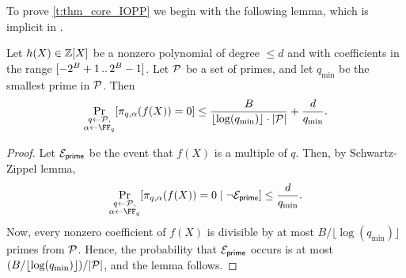 \documentclass[11pt,letterpaper,usenames,dvipsnames]{article}
\begin{document}
To prove \cref{t:thm_core_IOPP} we begin with the following lemma, which is implicit in \cite{zincplus}. 
\begin{lemma}\label{l:reduction_lemma}
Let $h(X)\in \mathbb{Z}[X]$ be a nonzero polynomial of degree $\leq d$ and with coefficients in the range $[-2^{B}+1 \, .. \, 2^B-1]$. Let $\mathcal{P}$ be a set of primes, and let $q_{\min}$ be the smallest prime in $\mathcal{P}$. Then 
%
$$
\Pr_{\substack{q\gets \cP,\\\alpha \gets \FF_q}}[\pi_{q,\alpha}(f(X))=0] \leq \frac{B}{\lfloor\log(q_{\min})\rfloor\cdot |\cP|} + \frac{d}{q_{\min}}.
$$
\end{lemma}
\begin{proof}
Let $\mathcal{E}_{\mathsf{prime}}$ be the event that $f(X)$ is  a multiple of $q$. Then, by Schwartz-Zippel lemma, $$\Pr_{\substack{q\gets \cP,\\\alpha \gets \FF_q}}[\pi_{q,\alpha}(f(X))=0\mid \neg \cE_{\mathsf{prime}}] \leq  \frac{d}{q_{\min}}.$$
%
Now, every nonzero coefficient of $f(X)$ is divisible by at most $B/\lfloor\log(q_{\min})\rfloor$ primes from $\mathcal{P}$. Hence, the probability that $\mathcal{E}_{\mathsf{prime}}$ occurs is at most $(B/\lfloor\log(q_{\min})\rfloor)/|\mathcal{P}|$, and the lemma follows.
%
\end{proof}
\end{document}
